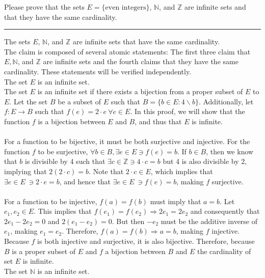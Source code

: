 \documentclass{article}
\begin{document}
 Please prove that the sets $E = \{\mbox{even integers}\}$, $\mathbb{N}$, and $\mathbb{Z}$ are
infinite sets and that they have the same cardinality. 

\noindent\rule{\textwidth}{0.4pt}\vspace{0.05in}
 The sets $E$, $\mathbb{N}$, and $\mathbb{Z}$ are infinite sets that have the same cardinality.
\\[0.05in]  The claim is composed of several atomic statements: The first three claim that $E, \mathbb{N}$, and $\mathbb{Z}$ are infinite sets and the fourth claims that they have the same cardinality. These statements will be verified independently.
\\[0.1in]  The set $E$ is an infinite set.
\\[0.05in]  The set $E$ is an infinite set if there exists a bijection from a proper subset of $E$ to $E$. Let the set $B$ be a subset of $E$ such that $B = \{b \in E: 4\backslash b \}$. Additionally, let $f: E \rightarrow B$ such that $f(e) = 2\cdot e \ \forall e \in E$. In this proof, we will show that the function $f$ is a bijection between $E$ and $B$, and thus that $E$ is  infinite.
\\ \\
For a function to be bijective, it must be both surjective and injective. For the function $f$ to be surjective, $\forall b \in B, \exists e \in E \ni f(e) = b$. If $b \in B$, then we know that $b$ is divisible by 4 such that $\exists c \in \mathbb{Z} \ni 4\cdot c = b$ but 4 is also divisible by 2, implying that $2(2\cdot c) = b$. Note that $2\cdot c \in E$, which implies that $\exists e \in E \ \ni 2\cdot e = b$, and hence that $\exists e \in E \ \ni f(e) = b$, making $f$ surjective.
\\ \\
For a function to be injective, $f(a) = f(b)$ must imply that $a = b$.  Let $e_1, e_2 \in E$. This implies that $f(e_1) = f(e_2) \Rightarrow 2e_1 = 2e_2$ and consequently that $2e_1 - 2e_2 = 0$ and $2(e_1 - e_2) = 0$. But then $-e_2$ must be the additive inverse of $e_1$, making $e_1 = e_2$. Therefore, $f(a) = f(b) \Rightarrow a = b$, making $f$ injective. Because $f$ is both injective and surjective, it is also bijective.  Therefore, because $B$ is a proper subset of $E$ and $f$ a bijection between $B$ and $E$ the cardinality of set $E$ is infinite.
\\[0.1in]  The set $\mathbb{N}$ is an infinite set.
\end{document}
